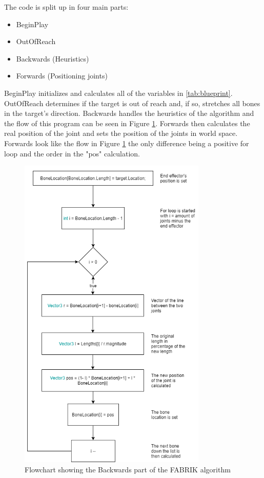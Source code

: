 The code is split up in four main parts:

\begin{itemize}
\item BeginPlay
\item OutOfReach
\item Backwards (Heuristics)
\item Forwards (Positioning joints)
\end{itemize}

BeginPlay initializes and calculates all of the variables in \autoref{tab:blueprint}. OutOfReach determines if the target is out of reach and, if so, stretches all bones in the target's direction. 
Backwards handles the heuristics of the algorithm and the flow of this program can be seen in Figure \ref{fig:flow}. Forwards then calculates the real position of the joint and sets the position of the joints in world space. Forwards look like the flow in Figure \ref{fig:flow} the only difference being a positive for loop and the order in the "pos" calculation.

\begin{figure}[H]
	\centering
	\includegraphics[width=0.8\textwidth]{FABRIK/Flowchart.png}
	\caption{Flowchart showing the Backwards part of the FABRIK algorithm}
	\label{fig:flow}
\end{figure}

